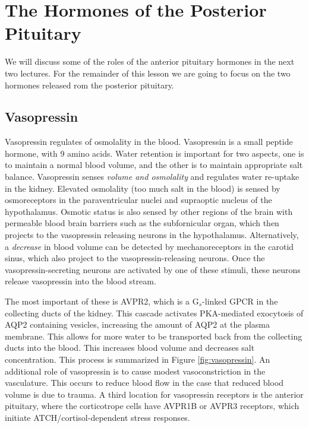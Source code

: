 \documentclass{tufte-handout}
\begin{document}
\section{The Hormones of the Posterior Pituitary}

We will discuss some of the roles of the anterior pituitary hormones in the next two lectures.  For the remainder of this lesson we are going to focus on the two hormones released rom the posterior pituitary.

\subsection{Vasopressin}

Vasopressin regulates of osmolality in the blood.  Vasopressin is a small peptide hormone, with 9 amino acids.  Water retention is important for two aspects, one is to maintain a normal blood volume, and the other is to maintain appropriate salt balance.  Vasopressin senses \emph{volume and osmolality} and regulates water re-uptake in the kidney.  Elevated osmolality (too much salt in the blood) is sensed by osmoreceptors in the  paraventricular nuclei  and supraoptic nucleus of the hypothalamus.  Osmotic status is also sensed by other regions of the brain with permeable blood brain barriers such as the subfornicular organ, which then projects to the vasopressin releasing neurons in the hypothalamus.  Alternatively, a \emph{decrease} in blood volume can be detected by mechanoreceptors in the carotid sinus, which also project to the vasopressin-releasing neurons.  Once the vasopressin-secreting neurons are activated by one of these stimuli, these neurons release vasopressin into the blood stream.

 The most important of these is AVPR2, which is a G$_s$-linked GPCR in the collecting ducts of the kidney.  This cascade activates PKA-mediated exocytosis of AQP2 containing vesicles, increasing the amount of AQP2 at the plasma membrane.  This allows for more water to be transported back from the collecting ducts into the blood.  This increases blood volume and decreases salt concentration.  This process is summarized in Figure \ref{fig:vasopressin}.  An additional role of vasopressin is to cause modest vasoconstriction in the vasculature.  This occurs to reduce blood flow in the case that reduced blood volume is due to trauma.  A third location for vasopressin receptors is the anterior pituitary, where the corticotrope cells have AVPR1B or AVPR3 receptors, which initiate  ATCH/cortisol-dependent stress responses.
\end{document}
